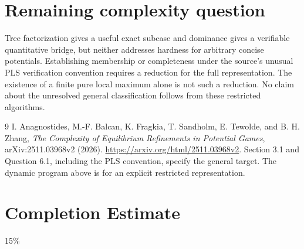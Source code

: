 \documentclass[11pt,a4paper]{article}
\theoremstyle{definition}
\theoremstyle{remark}
\begin{document}
\section{Remaining complexity question}
Tree factorization gives a useful exact subcase and dominance gives a verifiable quantitative bridge, but neither addresses hardness for arbitrary concise potentials. Establishing membership or completeness under the source's unusual PLS verification convention requires a reduction for the full representation. The existence of a finite pure local maximum alone is not such a reduction. No claim about the unresolved general classification follows from these restricted algorithms.
\begin{thebibliography}{9}
 I. Anagnostides, M.-F. Balcan, K. Fragkia, T. Sandholm, E. Tewolde, and B. H. Zhang, \emph{The Complexity of Equilibrium Refinements in Potential Games}, arXiv:2511.03968v2 (2026). \url{https://arxiv.org/html/2511.03968v2}. Section 3.1 and Question 6.1, including the PLS convention, specify the general target. The dynamic program above is for an explicit restricted representation.
\end{thebibliography}

\section{Completion Estimate}
15\%
\end{document}
